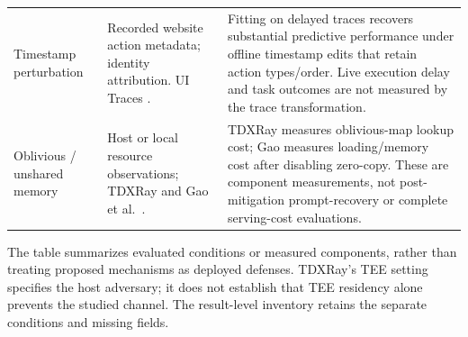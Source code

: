 \begin{table}[t]
\begin{tabularx}{\textwidth}{@{}p{}p{}Y@{}}
Timestamp perturbation & Recorded website action metadata; identity attribution. UI Traces \cite{uitraces2026}. & Fitting on delayed traces recovers substantial predictive performance under offline timestamp edits that retain action types/order. Live execution delay and task outcomes are not measured by the trace transformation.\\
Oblivious / unshared memory & Host or local resource observations; TDXRay and Gao et al.\ \cite{hornetz2026tdxray,gao2025iknow}. & TDXRay measures oblivious-map lookup cost; Gao measures loading/memory cost after disabling zero-copy. These are component measurements, not post-mitigation prompt-recovery or complete serving-cost evaluations.\\\bottomrule
\end{tabularx}
\par\smallskip\raggedright\footnotesize
The table summarizes evaluated conditions or measured components, rather than treating proposed mechanisms as deployed defenses. TDXRay's TEE setting specifies the host adversary; it does not establish that TEE residency alone prevents the studied channel. The result-level inventory retains the separate conditions and missing fields.
\end{table}
